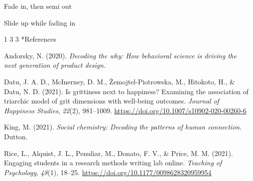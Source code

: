 \documentclass[12pt,
  a4paper,
  landscape]{article}
\makeatletter
\newlength{\cslhangindent}
\newenvironment{CSLReferences}[2] %
 {%
  \setlength{\parindent}{0pt}
  \ifodd #1 \everypar{\setlength{\hangindent}{\cslhangindent}}\ignorespaces\fi
  \ifnum #2 > 0
  \setlength{\parskip}{#2\baselineskip}
  \fi
 }%
 {}
\let\oldsection\section
\renewcommand\section{\clearpage\oldsection}
\renewcommand{\section}{\@startsection
{section}%
{1}%
{\z@}%
{3\baselineskip}%
{3\baselineskip}%
{\sffamily\huge\bfseries}} %
\makeatother
\begin{document}
Fade in, then semi out

Slide up while fading in

\newpage

\vspace*{2.5cm}

\begin{center}

\hypertarget{references-1}{%
\section*{References}\label{references-1}}

\end{center}

\hypertarget{refs}{}
\begin{CSLReferences}{1}{0}
\leavevmode{}%
Andorsky, N. (2020). \emph{Decoding the why: How behavioral science is
driving the next generation of product design}.

\leavevmode{}%
Datu, J. A. D., McInerney, D. M., Żemojtel-Piotrowska, M., Hitokoto, H.,
\& Datu, N. D. (2021). Is grittiness next to happiness? Examining the
association of triarchic model of grit dimensions with well-being
outcomes. \emph{Journal of Happiness Studies}, \emph{22}(2), 981--1009.
\url{https://doi.org/10.1007/s10902-020-00260-6}

\leavevmode{}%
King, M. (2021). \emph{Social chemistry: Decoding the patterns of human
connection}. Dutton.

\leavevmode{}%
Rice, L., Alquist, J. L., Penuliar, M., Donato, F. V., \& Price, M. M.
(2021). Engaging students in a research methods writing lab online.
\emph{Teaching of Psychology}, \emph{48}(1), 18--25.
\url{https://doi.org/10.1177/0098628320959954}

\end{CSLReferences}
\end{document}
